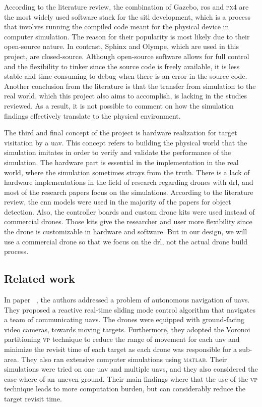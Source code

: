 \documentclass[../main.tex]{subfiles}
\begin{document}
	According to the literature review, 
	the combination of Gazebo, \gls{ros}
	and \textsc{px4} are the most widely used software stack 
	for the \gls{sitl} development,
	which is a process that involves running the compiled code
	meant for the physical device in computer simulation.
	The reason for their popularity is most likely 
	due to their open-source nature. 
	In contrast, Sphinx and Olympe, which are used in this project, 
	are closed-source.
	Although open-source software 
	allows for full control and the flexibility to tinker
	since the source code is freely available,
	it is less stable and time-consuming to debug
	when there is an error in the source code.
	Another conclusion from the literature is that 
	the transfer from simulation to the real world,
	which this project also aims to accomplish,
	is lacking in the studies reviewed.
	As a result, it is not possible to comment on 
	how the simulation findings effectively translate
	to the physical environment.
	
	The third and final concept of the project 
	is hardware realization for target visitation by a \gls{uav}.
	This concept refers to building the physical world
	that the simulation imitates in order to 
	verify and validate the performance of the simulation.
	The hardware part is essential in the implementation 
	in the real world, where the simulation 
	sometimes strays from the truth.
	There is a lack of hardware implementations in 
	the field of research regarding drones with \gls{drl}, 
	and most of the research papers focus on the simulations.
	According to the literature review, the \gls{cnn} 
	models were used in the majority of the papers for object detection. 
	Also, the controller boards and custom drone kits 
	were used instead of commercial drones.
	Those kits give the researcher and user more flexibility 
	since the drone is customizable 
	in hardware and software. But in our design, 
	we will use a commercial drone so that we focus
	on the \gls{drl}, not the actual drone build process. 
	
	\subsection{Related work}
	
	In paper ~\cite{hua20}, the authors \citeauthor{hua20} 
	addressed a problem of autonomous navigation of \glspl{uav}. 
	They proposed a reactive real-time sliding mode control algorithm 
	that navigates a team of communicating \glspl{uav}.
	The drones were equipped with ground-facing video cameras,
	towards moving targets. 
	Furthermore, they adopted the Voronoi partitioning \textsc{vp} technique 
	to reduce the range of movement for each \gls{uav} and 
	minimize the revisit time of each target as each drone was responsible 
	for a sub-area.
	They also ran extensive computer simulations using \textsc{matlab}. 
	Their simulations were tried on one \gls{uav} and multiple \glspl{uav},
	and they also considered the case where of an uneven ground. 
	Their main findings where that the use of the \textsc{vp} technique 
	leads to more computation burden, but can considerably reduce the target 
	revisit time.
	
\end{document}
